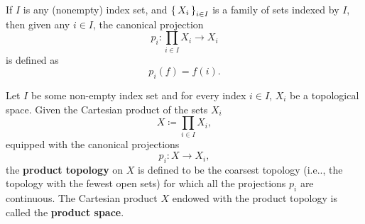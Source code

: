 \documentclass[12pt, letterpaper]{article}
\makeatletter
\newcommand\ie{i.e\@ifnextchar.{}{.\@}}
\newcommand{\define}{\coloneqq}
\theoremstyle{definition}
\theoremstyle{remark}
\theoremstyle{definition}
\theoremstyle{plain}
\numberwithin{equation}{section}
\makeatother
\begin{document}
	\begin{def*}
		If $I$ is any (nonempty) index set, and $\set{X_{i}}_{i\in I}$ is a family of sets indexed by $I$,
		then given any $i\in I$, the canonical projection
		\[p_i\colon \prod_{i\in I}X_i\to X_i\]
		is defined as
		\[ p_i(f)=f(i). \]
	\end{def*}
	
	\begin{def*}
		Let $I$ be some non-empty index set and for every index $i\in I$, $X_{i}$ be a topological space.
		Given the Cartesian product of the sets $X_{i}$
		\[X\define\prod _{{i\in I}}X_{i},\]
		equipped with the canonical projections
		\[p_{i}:X\to X_{i},\] the \textbf{product topology} on
		$X$ is defined to be the coarsest topology (\ie, the topology with the fewest open sets) for which all the projections $p_{i}$ are continuous.
		The Cartesian product $X$ endowed with the product topology is called the \textbf{product space}.
	\end{def*}
\end{document}
